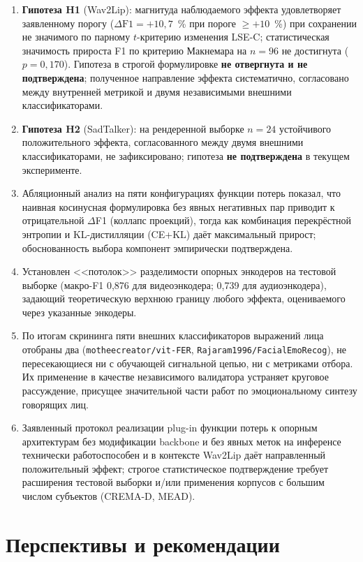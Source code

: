 \documentclass[a4paper, 12pt, oneside, openany]{article}
\begin{document}
\begin{enumerate}
\item \textbf{Гипотеза H1} (Wav2Lip): магнитуда наблюдаемого эффекта удовлетворяет заявленному порогу ($\Delta\text{F1} = +10{,}7$~\% при пороге $\geq +10$~\%) при сохранении не значимого по парному $t$-критерию изменения LSE-C; статистическая значимость прироста F1 по критерию Макнемара на $n=96$ не достигнута ($p = 0{,}170$). Гипотеза в строгой формулировке \textbf{не отвергнута и не подтверждена}; полученное направление эффекта систематично, согласовано между внутренней метрикой и двумя независимыми внешними классификаторами.
\item \textbf{Гипотеза H2} (SadTalker): на рендеренной выборке $n=24$ устойчивого положительного эффекта, согласованного между двумя внешними классификаторами, не зафиксировано; гипотеза \textbf{не подтверждена} в текущем эксперименте.
\item Абляционный анализ на пяти конфигурациях функции потерь показал, что наивная косинусная формулировка без явных негативных пар приводит к отрицательной $\Delta$F1 (коллапс проекций), тогда как комбинация перекрёстной энтропии и KL-дистилляции (CE+KL) даёт максимальный прирост; обоснованность выбора компонент эмпирически подтверждена.
\item Установлен <<потолок>> разделимости опорных энкодеров на тестовой выборке (макро-F1 0,876 для видеоэнкодера; 0,739 для аудиоэнкодера), задающий теоретическую верхнюю границу любого эффекта, оцениваемого через указанные энкодеры.
\item По итогам скрининга пяти внешних классификаторов выражений лица отобраны два (\texttt{motheecreator/vit-FER}, \texttt{Rajaram1996/FacialEmoRecog}), не пересекающиеся ни с обучающей сигнальной цепью, ни с метриками отбора. Их применение в качестве независимого валидатора устраняет круговое рассуждение, присущее значительной части работ по эмоциональному синтезу говорящих лиц.
\item Заявленный протокол реализации plug-in функции потерь к опорным архитектурам без модификации backbone и без явных меток на инференсе технически работоспособен и в контексте Wav2Lip даёт направленный положительный эффект; строгое статистическое подтверждение требует расширения тестовой выборки и/или применения корпусов с большим числом субъектов (CREMA-D, MEAD).
\end{enumerate}

\section{Перспективы и рекомендации}
\end{document}
